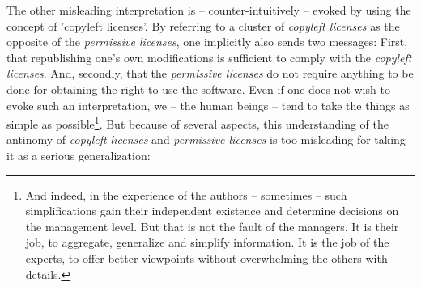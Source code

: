 The other misleading interpretation is -- counter-intuitively -- evoked by using
the concept of 'copyleft licenses'. By referring to a cluster of \emph{copyleft
licenses} as the opposite of the \emph{permissive licenses}, one implicitly also
sends two messages: First, that republishing one's own modifications is
sufficient to comply with the \emph{copyleft licenses}. And, secondly, that the
\emph{permissive licenses} do not require anything to be done for obtaining the
right to use the software. Even if one does not wish to evoke such an
interpretation, we -- the human beings -- tend to take the things as simple as
possible\footnote{And indeed, in the experience of the authors -- sometimes --
such simplifications gain their independent existence and determine decisions on
the management level. But that is not the fault of the managers. It is their
job, to aggregate, generalize and simplify information. It is the job of the
experts, to offer better viewpoints without overwhelming the others with
details.}. But because of several aspects, this understanding of the antinomy of
\emph{copyleft licenses} and \emph{permissive licenses} is too misleading for
taking it as a serious generalization:

